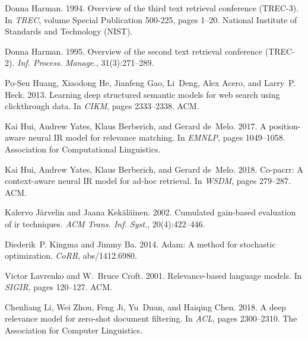 \documentclass[11pt,a4paper]{article}
\begin{document}
\begin{thebibliography}{32}
	Donna Harman. 1994.
	\newblock Overview of the third text retrieval conference {(TREC-3)}.
	\newblock In \emph{{TREC}}, volume Special Publication 500-225, pages 1--20.
	National Institute of Standards and Technology {(NIST)}.
	
	Donna Harman. 1995.
	\newblock Overview of the second text retrieval conference {(TREC-2)}.
	\newblock \emph{Inf. Process. Manage.}, 31(3):271--289.
	
	Po{-}Sen Huang, Xiaodong He, Jianfeng Gao, Li~Deng, Alex Acero, and Larry~P.
	Heck. 2013.
	\newblock Learning deep structured semantic models for web search using
	clickthrough data.
	\newblock In \emph{{CIKM}}, pages 2333--2338. {ACM}.
	
	Kai Hui, Andrew Yates, Klaus Berberich, and Gerard de~Melo. 2017.
	 {A} position-aware neural {IR} model for relevance matching.
	\newblock In \emph{{EMNLP}}, pages 1049--1058. Association for Computational
	Linguistics.
	
	Kai Hui, Andrew Yates, Klaus Berberich, and Gerard de~Melo. 2018.
	\newblock Co-pacrr: {A} context-aware neural {IR} model for ad-hoc retrieval.
	\newblock In \emph{{WSDM}}, pages 279--287. {ACM}.
	
	Kalervo J\"{a}rvelin and Jaana Kek\"{a}l\"{a}inen. 2002.
	\newblock Cumulated gain-based evaluation of ir techniques.
	\newblock \emph{ACM Trans. Inf. Syst.}, 20(4):422--446.
	
	Diederik~P. Kingma and Jimmy Ba. 2014.
	\newblock Adam: {A} method for stochastic optimization.
	\newblock \emph{CoRR}, abs/1412.6980.
	
	Victor Lavrenko and W.~Bruce Croft. 2001.
	\newblock Relevance-based language models.
	\newblock In \emph{{SIGIR}}, pages 120--127. {ACM}.
	
	Chenliang Li, Wei Zhou, Feng Ji, Yu~Duan, and Haiqing Chen. 2018.
	\newblock A deep relevance model for zero-shot document filtering.
	\newblock In \emph{ACL}, pages 2300--2310. The Association for Computer
	Linguistics.
	

\end{thebibliography}
\end{document}
